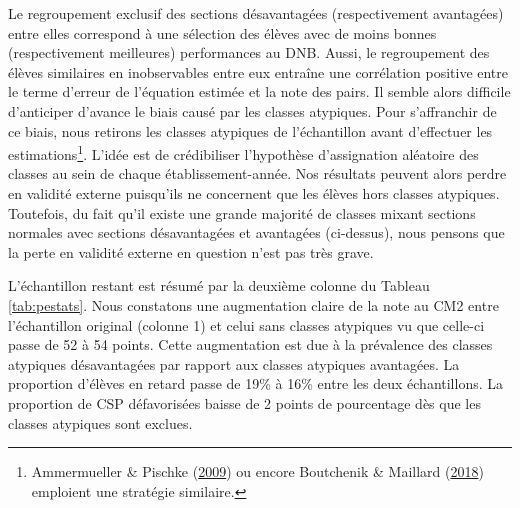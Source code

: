 \documentclass[
]{book}
\begin{document}
\quad Le regroupement exclusif des sections désavantagées (respectivement avantagées) entre elles correspond à une sélection des élèves avec de moins bonnes (respectivement meilleures) performances au DNB. Aussi, le regroupement des élèves similaires en inobservables entre eux entraîne une corrélation positive entre le terme d'erreur de l'équation estimée et la note des pairs. Il semble alors difficile d'anticiper d'avance le biais causé par les classes atypiques.
Pour s'affranchir de ce biais, nous retirons les classes atypiques de l'échantillon avant d'effectuer les estimations\footnote{Ammermueller \& Pischke (\protect\hyperlink{ref-AMM:PIS:09}{2009}) ou encore Boutchenik \& Maillard (\protect\hyperlink{ref-BOU:MAI:18}{2018}) emploient une stratégie similaire.}. L'idée est de crédibiliser l'hypothèse d'assignation aléatoire des classes au sein de chaque établissement-année. Nos résultats peuvent alors perdre en validité externe puisqu'ils ne concernent que les élèves hors classes atypiques. Toutefois, du fait qu'il existe une grande majorité de classes mixant sections normales avec sections désavantagées et avantagées (ci-dessus), nous pensons que la perte en validité externe en question n'est pas très grave.

\quad L'échantillon restant est résumé par la deuxième colonne du Tableau \ref{tab:pestats}. Nous constatons une augmentation claire de la note au CM2 entre l'échantillon original (colonne 1) et celui sans classes atypiques vu que celle-ci passe de 52 à 54 points. Cette augmentation est due à la prévalence des classes atypiques désavantagées par rapport aux classes atypiques avantagées. La proportion d'élèves en retard passe de 19\% à 16\% entre les deux échantillons. La proportion de CSP défavorisées baisse de 2 points de pourcentage dès que les classes atypiques sont exclues.
\end{document}
